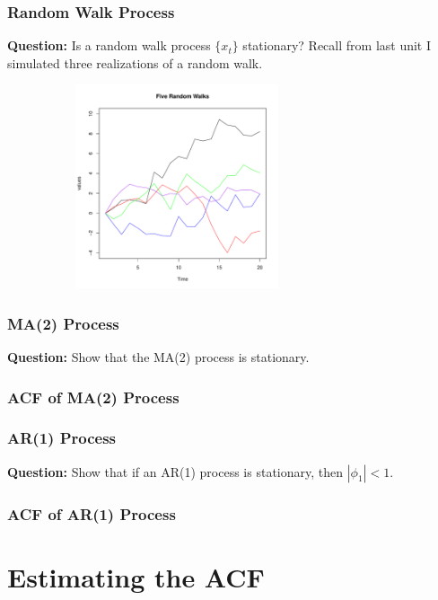 \documentclass[%
xcolor=pdftex]{beamer}
\begin{document}
\begin{frame}
\frametitle{Random Walk Process}

\textbf{Question:} Is a random walk process $\{x_t\}$ stationary? Recall from last unit I simulated three realizations of a random walk.

\includegraphics[width=100mm, height=60mm]{pics/randomwalk.pdf}

\end{frame}


\begin{frame}
\frametitle{MA(2) Process}

\textbf{Question:} Show that the MA(2) process is stationary.


\vspace{50mm}

\end{frame}

\begin{frame}
\frametitle{ACF of MA(2) Process}



\end{frame}

\begin{frame}
\frametitle{AR(1) Process}

\textbf{Question:} Show that if an AR(1) process is stationary, then $|\phi_1| < 1$.


\vspace{50mm}

\end{frame}

\begin{frame}
\frametitle{ACF of AR(1) Process}



\end{frame}

\section{Estimating the ACF}
\frame{\tableofcontents[currentsection]}
\end{document}

